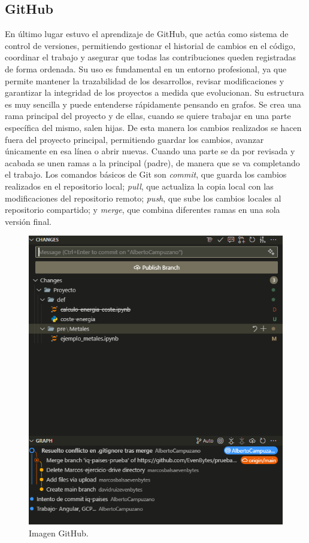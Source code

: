 \subsection{GitHub}
%
%
En último lugar estuvo el aprendizaje de GitHub, que actúa como sistema de control de versiones, permitiendo gestionar el historial de cambios en el código, coordinar el trabajo y asegurar que todas las contribuciones queden registradas de forma ordenada. Su uso es fundamental en un entorno profesional, ya que permite mantener la trazabilidad de los desarrollos, revisar modificaciones y garantizar la integridad de los proyectos a medida que evolucionan. Su estructura es muy sencilla y puede entenderse rápidamente pensando en grafos. Se crea una rama principal del proyecto y de ellas, cuando se quiere trabajar en una parte específica del mismo, salen hijas. De esta manera los cambios realizados se hacen fuera del proyecto principal, permitiendo guardar los cambios, avanzar únicamente en esa línea o abrir nuevas. Cuando una parte se da por revisada y acabada se unen ramas a la principal (padre), de manera que se va completando el trabajo. Los comandos básicos de Git son \textit{commit}, que guarda los cambios realizados en el repositorio local; \textit{pull}, que actualiza la copia local con las modificaciones del repositorio remoto; \textit{push}, que sube los cambios locales al repositorio compartido; y \textit{merge}, que combina diferentes ramas en una sola versión final.
\begin{figure}[H]
    \centering
    \includegraphics[width=0.42\linewidth]{figuras/captura_github.png}
    \caption[Interfaz de GitHub en Visual Code]{Imagen GitHub.}
    \label{GitHub}
\end{figure}
%
%
